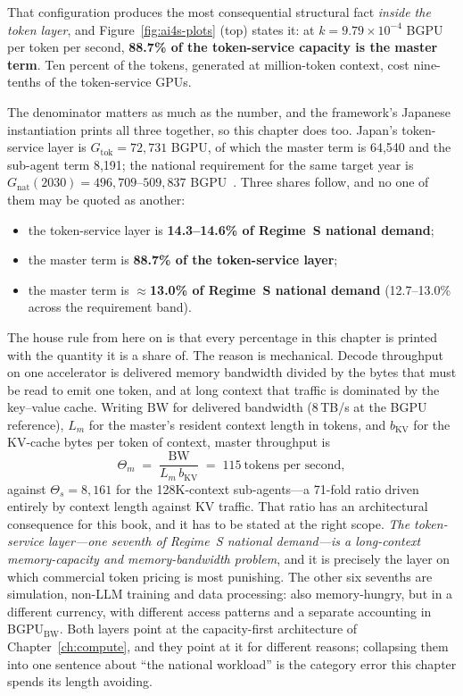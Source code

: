 That configuration produces the most consequential structural fact \emph{inside the token layer}, and Figure~\ref{fig:ai4s-plots} (top) states it: at $k = 9.79\times10^{-4}$ BGPU per token per second, \textbf{88.7\% of the token-service capacity is the master term}. Ten percent of the tokens, generated at million-token context, cost nine-tenths of the token-service GPUs.

The denominator matters as much as the number, and the framework's Japanese instantiation prints all three together, so this chapter does too. Japan's token-service layer is $G_{\mathrm{tok}} = 72{,}731$ BGPU, of which the master term is 64,540 and the sub-agent term 8,191; the national requirement for the same target year is $G_{\mathrm{nat}}(2030) = 496{,}709$--$509{,}837$ BGPU~\cite{ai4s-framework}. Three shares follow, and no one of them may be quoted as another:

\begin{itemize}\itemsep2pt
  \item the token-service layer is \textbf{14.3--14.6\% of Regime~S national demand};
  \item the master term is \textbf{88.7\% of the token-service layer};
  \item the master term is \textbf{$\approx$13.0\% of Regime~S national demand} (12.7--13.0\% across the requirement band).
\end{itemize}

The house rule from here on is that every percentage in this chapter is printed with the quantity it is a share of. The reason is mechanical. Decode throughput on one accelerator is delivered memory bandwidth divided by the bytes that must be read to emit one token, and at long context that traffic is dominated by the key--value cache. Writing $\mathrm{BW}$ for delivered bandwidth (8\,TB/s at the BGPU reference), $L_m$ for the master's resident context length in tokens, and $b_{\mathrm{KV}}$ for the KV-cache bytes per token of context, master throughput is
\[
\Theta_m \;=\; \frac{\mathrm{BW}}{L_m\, b_{\mathrm{KV}}} \;=\; 115 \ \text{tokens per second},
\]
against $\Theta_s = 8{,}161$ for the 128K-context sub-agents---a 71-fold ratio driven entirely by context length against KV traffic. That ratio has an architectural consequence for this book, and it has to be stated at the right scope. \emph{The token-service layer---one seventh of Regime~S national demand---is a long-context memory-capacity and memory-bandwidth problem}, and it is precisely the layer on which commercial token pricing is most punishing. The other six sevenths are simulation, non-LLM training and data processing: also memory-hungry, but in a different currency, with different access patterns and a separate accounting in BGPU$_{\mathrm{BW}}$. Both layers point at the capacity-first architecture of Chapter~\ref{ch:compute}, and they point at it for different reasons; collapsing them into one sentence about ``the national workload'' is the category error this chapter spends its length avoiding.

